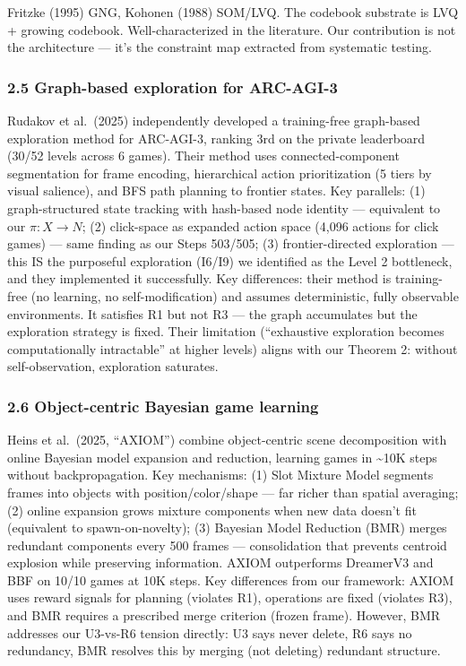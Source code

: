\documentclass[
  11pt,
]{article}
\begin{document}
Fritzke (1995) GNG, Kohonen (1988) SOM/LVQ. The codebook substrate is
LVQ + growing codebook. Well-characterized in the literature. Our
contribution is not the architecture --- it's the constraint map
extracted from systematic testing.

\subsubsection{2.5 Graph-based exploration for
ARC-AGI-3}\label{graph-based-exploration-for-arc-agi-3}

Rudakov et al.~(2025) independently developed a training-free
graph-based exploration method for ARC-AGI-3, ranking 3rd on the private
leaderboard (30/52 levels across 6 games). Their method uses
connected-component segmentation for frame encoding, hierarchical action
prioritization (5 tiers by visual salience), and BFS path planning to
frontier states. Key parallels: (1) graph-structured state tracking with
hash-based node identity --- equivalent to our \(\pi: X \to N\); (2)
click-space as expanded action space (4,096 actions for click games) ---
same finding as our Steps 503/505; (3) frontier-directed exploration ---
this IS the purposeful exploration (I6/I9) we identified as the Level 2
bottleneck, and they implemented it successfully. Key differences: their
method is training-free (no learning, no self-modification) and assumes
deterministic, fully observable environments. It satisfies R1 but not R3
--- the graph accumulates but the exploration strategy is fixed. Their
limitation (``exhaustive exploration becomes computationally
intractable'' at higher levels) aligns with our Theorem 2: without
self-observation, exploration saturates.

\subsubsection{2.6 Object-centric Bayesian game
learning}\label{object-centric-bayesian-game-learning}

Heins et al.~(2025, ``AXIOM'') combine object-centric scene
decomposition with online Bayesian model expansion and reduction,
learning games in \textasciitilde10K steps without backpropagation. Key
mechanisms: (1) Slot Mixture Model segments frames into objects with
position/color/shape --- far richer than spatial averaging; (2) online
expansion grows mixture components when new data doesn't fit (equivalent
to spawn-on-novelty); (3) Bayesian Model Reduction (BMR) merges
redundant components every 500 frames --- consolidation that prevents
centroid explosion while preserving information. AXIOM outperforms
DreamerV3 and BBF on 10/10 games at 10K steps. Key differences from our
framework: AXIOM uses reward signals for planning (violates R1),
operations are fixed (violates R3), and BMR requires a prescribed merge
criterion (frozen frame). However, BMR addresses our U3-vs-R6 tension
directly: U3 says never delete, R6 says no redundancy, BMR resolves this
by merging (not deleting) redundant structure.
\end{document}
